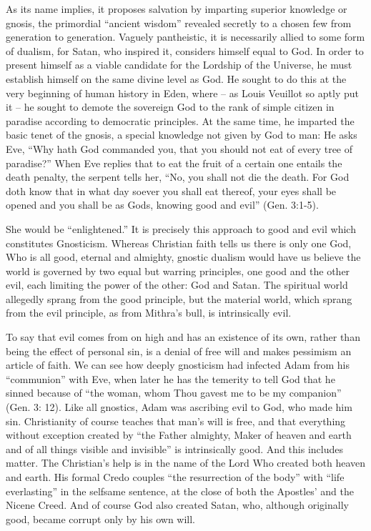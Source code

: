 As its name implies, it proposes salvation by imparting superior knowledge or gnosis, the primordial ``ancient wisdom'' revealed secretly to a chosen few from generation to generation. Vaguely pantheistic, it is necessarily allied to some form of dualism, for Satan, who inspired it, considers himself equal to God. In order to present himself as a viable candidate for the Lordship of the Universe, he must establish himself on the same divine level as God. He sought to do this at the very beginning of human history in Eden, where -- as Louis Veuillot so aptly put it -- he sought to demote the sovereign God to the rank of simple citizen in paradise according to democratic principles. At the same time, he imparted the basic tenet of the gnosis, a special knowledge not given by God to man: He asks Eve, ``Why hath God commanded you, that you should not eat of every tree of paradise?'' When Eve replies that to eat the fruit of a certain one entails the death penalty, the serpent tells her, ``No, you shall not die the death. For God doth know that in what day soever you shall eat thereof, your eyes shall be opened and you shall be as Gods, knowing good and evil'' (Gen. 3:1-5).

She would be ``enlightened.'' It is precisely this approach to good and evil which constitutes Gnosticism. Whereas Christian faith tells us there is only one God, Who is all good, eternal and almighty, gnostic dualism would have us believe the world is governed by two equal but warring principles, one good and the other evil, each limiting the power of the other: God and Satan. The spiritual world allegedly sprang from the good principle, but the material world, which sprang from the evil principle, as from Mithra's bull, is intrinsically evil.

To say that evil comes from on high and has an existence of its own, rather than being the effect of personal sin, is a denial of free will and makes pessimism an article of faith. We can see how deeply gnosticism had infected Adam from his ``communion'' with Eve, when later he has the temerity to tell God that he sinned because of ``the woman, whom Thou gavest me to be my companion'' (Gen. 3: 12). Like all gnostics, Adam was ascribing evil to God, who made him sin. Christianity of course teaches that man's will is free, and that everything without exception created by ``the Father almighty, Maker of heaven and earth and of all things visible and invisible'' is intrinsically good. And this includes matter. The Christian's help is in the name of the Lord Who created both heaven and earth. His formal Credo couples ``the resurrection of the body'' with ``life everlasting'' in the selfsame sentence, at the close of both the Apostles' and the Nicene Creed. And of course God also created Satan, who, although originally good, became corrupt only by his own will.

